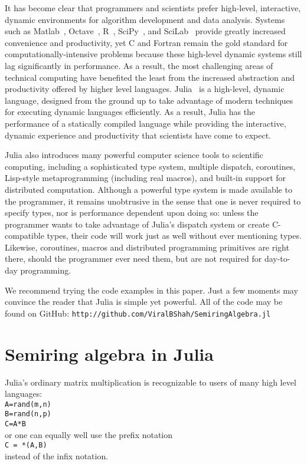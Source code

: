 \documentclass[conference]{IEEEtran}
\begin{document}
It has become clear that programmers and scientists prefer high-level, interactive, dynamic environments for algorithm development and data analysis.
Systems such as Matlab~\cite{matlab}, Octave~\cite{Octave}, R~\cite{Rlang}, SciPy~\cite{numpy}, and SciLab~\cite{scilab} provide greatly increased convenience and productivity, yet C and Fortran remain the gold standard for computationally-intensive problems because these high-level dynamic systems still lag significantly in performance.
As a result, the most challenging areas of technical computing have benefited the least from the increased abstraction and productivity offered by higher level languages.
Julia~\cite{julia} is a high-level, dynamic language, designed from the ground up to take advantage of modern techniques for executing dynamic languages efficiently.
As a result, Julia has the performance of a statically compiled language while providing the interactive, dynamic experience and productivity that scientists have come to expect.

Julia also introduces many powerful computer science tools to scientific computing, including a sophisticated type system, multiple dispatch, coroutines, Lisp-style metaprogramming (including real macros), and built-in support for distributed computation.
Although a powerful type system is made available to the programmer, it remains unobtrusive in the sense that one is never required to specify types, nor is performance dependent upon doing so:
unless the programmer wants to take advantage of Julia's dispatch system or create C-compatible types, their code will work just as well without ever mentioning types.
Likewise, coroutines, macros and distributed programming primitives are right there, should the programmer ever need them, but are not required for day-to-day programming.

We recommend trying the code examples in this paper.
Just a few moments may convince the reader that Julia is simple yet powerful.
All of the code may be found on GitHub:
{\tt http://github.com/ViralBShah/SemiringAlgebra.jl}

\section{Semiring algebra in Julia}

Julia's ordinary matrix multiplication is recognizable to users of many
high level languages: \\
{\tt A=rand(m,n) \\  B=rand(n,p) \\ C=A*B } \\
or one can equally well use the prefix notation \\
{\tt C = *(A,B)} \\
instead of the infix notation.
\end{document}
